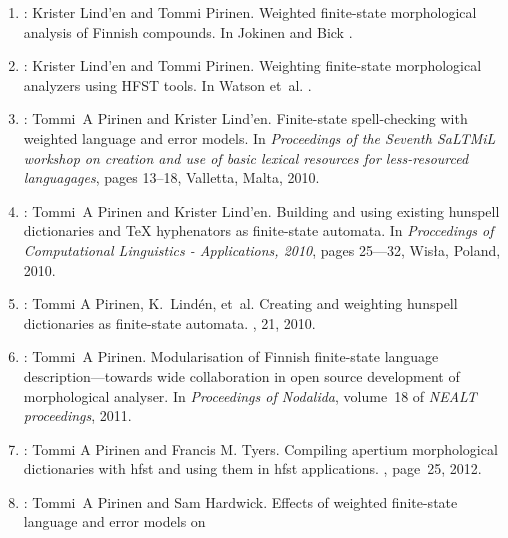 \documentclass[officiallayout,draft]{unihelcompling}
\begin{document}
\begin{enumerate}
    \item \cite{pirinen2009weighted}:
        Krister Lind{'e}n and Tommi Pirinen.
        \newblock Weighted finite-state morphological analysis of Finnish 
        compounds.
        \newblock In Jokinen and Bick \cite{conf/nodalida/2009}.
    \item \cite{pirinen2009weighting}:
        Krister Lind{'e}n and Tommi Pirinen.
        \newblock Weighting finite-state morphological analyzers using HFST
        tools.
        \newblock In Watson et~al. \cite{conf/fsmnlp/2009}.
    \item \cite{pirinen2010finitestate}:
        Tommi~A Pirinen and Krister Lind'{e}n.
        \newblock Finite-state spell-checking with weighted language and error
        models.
        \newblock In {\em Proceedings of the Seventh SaLTMiL workshop on 
            creation and use of basic lexical resources for less-resourced 
        languagages}, pages 13--18, Valletta, Malta, 2010.
    \item \cite{pirinen2010building}:
        Tommi~A Pirinen and Krister Lind'{e}n.
        \newblock Building and using existing hunspell dictionaries and {\TeX }
        hyphenators as finite-state automata.
        \newblock In {\em Proccedings of Computational Linguistics -
            Applications, 2010}, pages 25---32, Wis{\l}a, Poland, 2010.
    \item \cite{pirinen2010creating}:
        Tommi A Pirinen, K.~Lind{\'e}n, et~al.
        \newblock Creating and weighting hunspell dictionaries as finite-state
        automata.
        , 21, 2010.
    \item \cite{pirinen2011modularisation}:
        Tommi~A Pirinen.
        \newblock Modularisation of Finnish finite-state language 
        description—towards wide collaboration in open source development of
        morphological analyser.
        \newblock In {\em Proceedings of Nodalida}, volume~18 of {\em NEALT
        proceedings}, 2011.
    \item \cite{pirinen2012compiling}: 
        Tommi A Pirinen and Francis M. Tyers.
        \newblock Compiling apertium morphological dictionaries with hfst and
        using them in hfst applications.
        , page~25, 2012.
    \item \cite{pirinen2012effects}: Tommi~A Pirinen and Sam Hardwick.
        \newblock Effects of weighted finite-state language and error models on

\end{enumerate}
\end{document}
